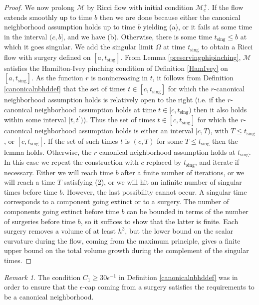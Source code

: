 \documentclass[12pt]{amsart}
\newcommand{\M}{{\mathcal M}}
\newcommand{\sing}{\operatorname{sing}}
\numberwithin{equation}{section}
\theoremstyle{plain}
\theoremstyle{definition}
\theoremstyle{remark}
\newtheorem{remark}[equation]{Remark}
\begin{document}
\begin{proof}
We now prolong $\M$  by Ricci flow with initial
condition $\M_c^+$. If the flow extends smoothly
up to time $b$ then we are done because either the canonical neighborhood
assumption holds up to time $b$ yielding (a), or it fails at some
time in the interval $(c,b]$, and we have (b).
Otherwise, there is some time $t_{\sing} \le b$ at which it goes singular.
We add the singular limit $\Omega$ at time $t_{\sing}$ 
to obtain a Ricci flow with surgery defined on $[a, t_{\sing}]$.
From Lemma \ref{preservingphipinching},
$\M$ satisfies
the Hamilton-Ivey pinching condition of
Definition \ref{HamIvey} on $[a,t_{\sing}]$.  
As the function $r$ is nonincreasing in $t$, it follows from
Definition \ref{canonicalnbhddef} that the set of times
$t\in [c,t_{\sing}]$ for which the $r$-canonical neighborhood assumption
holds is relatively open to the right (i.e. if the $r$-canonical
neighborhood assumption holds at time $t \in [c, t_{\sing})$ then
it also holds within some interval
$[t, t^\prime)$). Thus the set of times 
$t\in [c,t_{\sing}]$ for which the $r$-canonical neighborhood assumption
holds is either an interval $[c, T)$, with $T \le t_{\sing}$, or
$[c, t_{\sing}]$.
If the set of such times $t$ is
$(c, T)$ for some $T \le t_{\sing}$ then the lemma holds.
Otherwise, the $r$-canonical neighborhood assumption
holds at $t_{\sing}$.  In this case we repeat the construction
with $c$ replaced by $t_{\sing}$, and iterate if necessary. Either we
will reach time $b$ after a finite number  of iterations, or we 
will reach a time $T$ satisfying (2), 
or we will hit an infinite number of singular times
before time $b$. However, the last possibility cannot
occur.  A singular time corresponds to a component going extinct or
to a surgery. The number of components going extinct before time $b$
can be bounded in terms of the number of surgeries before time $b$,
so it suffices to show that the latter is finite.
Each surgery removes a volume of at least $h^3$, but
the lower bound on the scalar curvature during the flow, 
coming from the maximum principle,
gives a finite upper bound on the total volume growth during the complement
of the singular times.
\end{proof}

\begin{remark} \label{30}
The condition $C_1 \ge 30 \epsilon^{-1}$ in 
Definition \ref{canonicalnbhddef}
was in order to ensure that the $\epsilon$-cap coming from a 
surgery satisfies the requirements to be a canonical neighborhood.
\end{remark}
\end{document}

